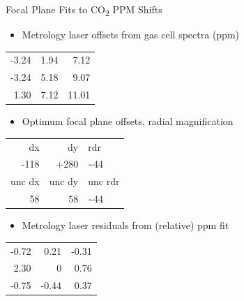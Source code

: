 \documentclass[10pt]{beamer}
\begin{document}
\begin{frame}[label={sec:org7d3bfb9}]{Focal Plane Fits to CO\textsubscript{2} PPM Shifts}
\begin{small}

\begin{itemize}
\item Metrology laser offsets from gas cell spectra (ppm)
\end{itemize}
\begin{center}
\begin{tabular}{rrr}
-3.24 & 1.94 & 7.12\\
-3.24 & 5.18 & 9.07\\
1.30 & 7.12 & 11.01\\
\end{tabular}
\end{center}

\begin{itemize}
\item Optimum focal plane offsets, radial magnification
\end{itemize}
\begin{center}
\begin{tabular}{rrl}
dx & dy & rdr\\
-118 & +280 & \textasciitilde{}44\\
\hline
unc   dx & unc   dy & unc rdr\\
58 & 58 & \textasciitilde{}44\\
\end{tabular}
\end{center}

\begin{itemize}
\item Metrology laser residuals from (relative) ppm fit
\end{itemize}
\begin{center}
\begin{tabular}{rrr}
-0.72 & 0.21 & -0.31\\
2.30 & 0 & 0.76\\
-0.75 & -0.44 & 0.37\\
\end{tabular}
\end{center}
\end{small}
\end{frame}
\end{document}
